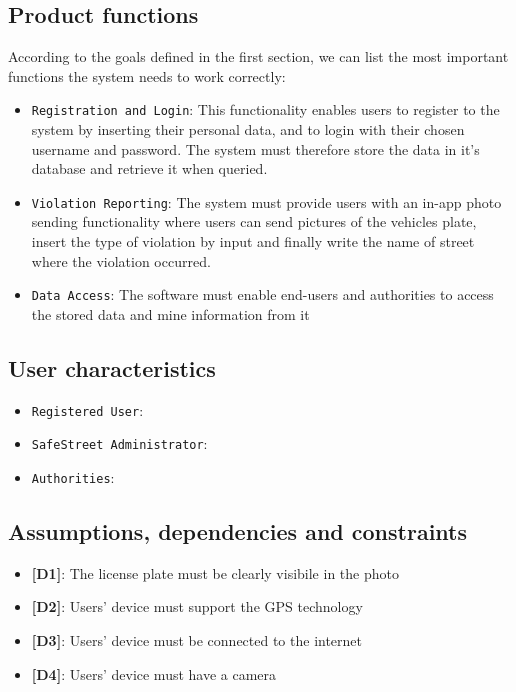 \documentclass[12pt,a4paper]{article}
\begin{document}
\subsection{Product functions} 
According to the goals defined in the first section, we can list the most important functions the system needs to work correctly:
\begin{itemize}
\item {\texttt{Registration and Login}}: This functionality enables users to register to the system by inserting their personal data, and to login with their chosen username and password. The system must therefore store the data in it's database and retrieve it when queried.  
\item {\texttt{Violation Reporting}}: The system must provide users with an in-app photo sending functionality where users can send pictures of the vehicles plate, insert the type of violation by input and finally write the name of street where the violation occurred.
\item {\texttt{Data Access}}: The software must enable end-users and authorities to access the stored data and mine information from it 
\end{itemize}
\subsection{User characteristics} 
\begin{itemize}
\item {\texttt{Registered User}}: 
\item {\texttt{SafeStreet Administrator}}: 
\item {\texttt{Authorities}}: 
\end{itemize}
\subsection{Assumptions, dependencies and constraints}
 \begin{itemize}
				\item {\textbf[}\textbf{D1}{\textbf]}: The license plate must be clearly visibile in the photo
				\item {\textbf[}\textbf{D2}{\textbf]}: Users' device must support the GPS technology
				\item {\textbf[}\textbf{D3}{\textbf]}: Users' device must be connected to the internet
				\item {\textbf[}\textbf{D4}{\textbf]}: Users' device must have a camera
			\end{itemize}
\end{document}
